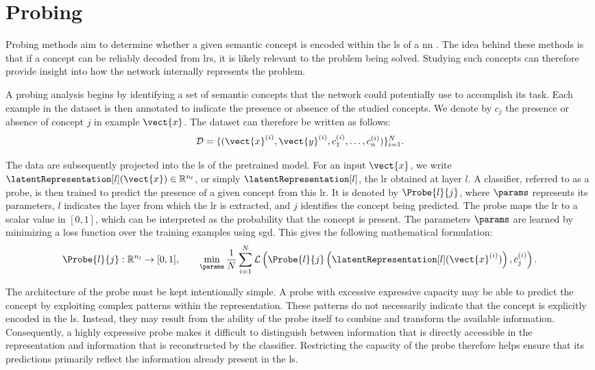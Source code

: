 \section{Probing}
\label{sec:probing}

Probing methods aim to determine whether a given semantic concept is encoded within the \gls{ls} of a \gls{nn} \parencite{li2024emergentworldrepresentationsexploring, karvonen2024emergentworldmodelslatent}.
The idea behind these methods is that if a concept can be reliably decoded from \glspl{lr}, it is likely relevant to the problem being solved.
Studying such concepts can therefore provide insight into how the network internally represents the problem.

A probing analysis begins by identifying a set of semantic concepts that the network could potentially use to accomplish its task.
Each example in the dataset is then annotated to indicate the presence or absence of the studied concepts.
We denote by $c_j$ the presence or absence of concept $j$ in example $\vect{x}$.
The dataset can therefore be written as follows:
\[
\mathcal{D} = \{(\vect{x}^{(i)}, \vect{y}^{(i)}, c^{(i)}_1, \dots, c^{(i)}_n)\}_{i=1}^{N}.
\]

The data are subsequently projected into the \gls{ls} of the pretrained model.
For an input $\vect{x}$, we write $\latentRepresentation[l](\vect{x}) \in \mathbb{R}^{n_l}$, or simply $\latentRepresentation[l]$, the \gls{lr} obtained at layer $l$.
A classifier, referred to as a probe, is then trained to predict the presence of a given concept from this \gls{lr}.
It is denoted by $\Probe{l}{j}$, where $\params$ represents its parameters, $l$ indicates the layer from which the \gls{lr} is extracted, and $j$ identifies the concept being predicted.
The probe maps the \gls{lr} to a scalar value in $[0,1]$, which can be interpreted as the probability that the concept is present.
The parameters $\params$ are learned by minimizing a loss function over the training examples using \gls{sgd}.
This gives the following mathematical formulation:
\begin{equation}
\Probe{l}{j} : \mathbb{R}^{n_l} \rightarrow [0,1],
\qquad
\min_{\params} \frac{1}{N} \sum_{i=1}^{N}
\mathcal{L}\left(
\Probe{l}{j}\left(\latentRepresentation[l](\vect{x}^{(i)})\right),
c_j^{(i)}
\right).
\label{eq:probe_function}
\end{equation}

The architecture of the probe must be kept intentionally simple.
A probe with excessive expressive capacity may be able to predict the concept by exploiting complex patterns within the representation.
These patterns do not necessarily indicate that the concept is explicitly encoded in the \gls{ls}.
Instead, they may result from the ability of the probe itself to combine and transform the available information.
Consequently, a highly expressive probe makes it difficult to distinguish between information that is directly accessible in the representation and information that is reconstructed by the classifier.
Restricting the capacity of the probe therefore helps ensure that its predictions primarily reflect the information already present in the \gls{ls}.

